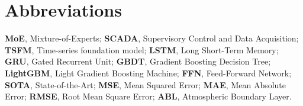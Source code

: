 \documentclass[review,3p,times]{elsarticle}
\begin{document}
\linenumbers

\section*{Abbreviations}
\noindent
\textbf{MoE}, Mixture-of-Experts;
\textbf{SCADA}, Supervisory Control and Data Acquisition;
\textbf{TSFM}, Time-series foundation model;
\textbf{LSTM}, Long Short-Term Memory;
\textbf{GRU}, Gated Recurrent Unit;
\textbf{GBDT}, Gradient Boosting Decision Tree;
\textbf{LightGBM}, Light Gradient Boosting Machine;
\textbf{FFN}, Feed-Forward Network;
\textbf{SOTA}, State-of-the-Art;
\textbf{MSE}, Mean Squared Error;
\textbf{MAE}, Mean Absolute Error;
\textbf{RMSE}, Root Mean Square Error;
\textbf{ABL}, Atmospheric Boundary Layer.

\end{document}
